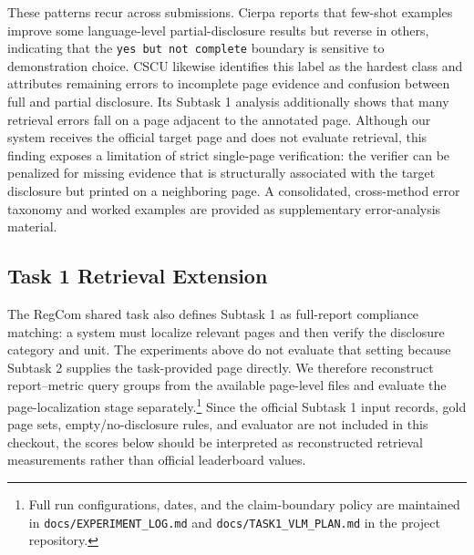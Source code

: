 \documentclass[sigconf,article]{acmart}
\begin{document}
These patterns recur across submissions. Cierpa reports that few-shot examples improve some language-level partial-disclosure results but reverse in others, indicating that the \texttt{yes but not complete} boundary is sensitive to demonstration choice. CSCU likewise identifies this label as the hardest class and attributes remaining errors to incomplete page evidence and confusion between full and partial disclosure. Its Subtask 1 analysis additionally shows that many retrieval errors fall on a page adjacent to the annotated page. Although our system receives the official target page and does not evaluate retrieval, this finding exposes a limitation of strict single-page verification: the verifier can be penalized for missing evidence that is structurally associated with the target disclosure but printed on a neighboring page. A consolidated, cross-method error taxonomy and worked examples are provided as supplementary error-analysis material.

\subsection{Task 1 Retrieval Extension}
\label{sec:task1-diagnostic}
The RegCom shared task also defines Subtask 1 as full-report compliance matching: a system must localize relevant pages and then verify the disclosure category and unit. The experiments above do not evaluate that setting because Subtask 2 supplies the task-provided page directly. We therefore reconstruct report--metric query groups from the available page-level files and evaluate the page-localization stage separately.\footnote{Full run configurations, dates, and the claim-boundary policy are maintained in \texttt{docs/EXPERIMENT\_LOG.md} and \texttt{docs/TASK1\_VLM\_PLAN.md} in the project repository.} Since the official Subtask 1 input records, gold page sets, empty/no-disclosure rules, and evaluator are not included in this checkout, the scores below should be interpreted as reconstructed retrieval measurements rather than official leaderboard values.
\end{document}
